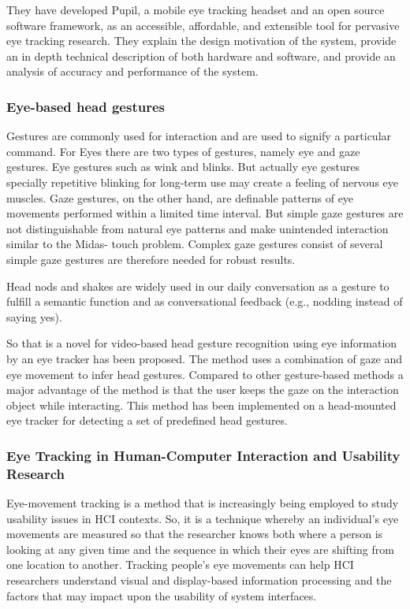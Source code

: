 They have developed Pupil, a mobile eye tracking headset and an open source software framework, as an accessible, affordable, and extensible tool for pervasive eye tracking research. They explain the design motivation of the system, provide an in depth technical description of both hardware and software, and provide an analysis of accuracy and performance of the system.
\bigskip


\subsubsection{Eye-based head gestures}
	Gestures are commonly used for interaction and are used to signify a particular command. For Eyes there are two types of gestures, namely eye and gaze gestures. Eye gestures such as wink and blinks. But actually eye gestures specially repetitive blinking for long-term use may create a feeling of nervous eye muscles.\cite{drewes2010eye} Gaze gestures, on the other hand, are definable patterns of eye movements performed within a limited time interval.\cite{istance2010designing} But simple gaze gestures are not distinguishable from natural eye patterns and make unintended interaction similar to the Midas-
touch problem. Complex gaze gestures consist of several simple gaze gestures are therefore needed for robust results.\bigskip

	Head nods and shakes are widely used in our daily conversation as a gesture to fulfill a semantic function and as conversational feedback (e.g., nodding instead of saying yes). \cite{darwin1998expression}
	\bigskip
	
	So that is a novel for video-based head gesture recognition using eye information by an eye tracker has been proposed. The method uses a combination of gaze and eye movement to infer head gestures. Compared to other gesture-based methods a major advantage of the method is that the user keeps the gaze on the interaction object while interacting. This method has been implemented on a head-mounted eye tracker for detecting a set of predefined head gestures.\cite{mardanbegi2012eye}

\subsubsection{Eye Tracking in Human-Computer Interaction and Usability Research}

Eye-movement tracking is a method that is increasingly being employed to study usability issues in HCI contexts. So, it is a technique whereby an individual’s eye movements are measured so that the researcher knows both where a person is looking at any given time and the sequence in which their eyes are shifting from one location to another. Tracking people’s eye movements can help HCI researchers understand visual and display-based information processing and the factors that may impact upon the usability of system
interfaces. \bigskip
 
